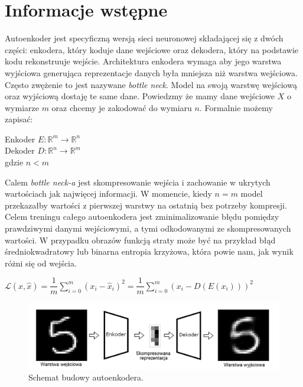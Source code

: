 \documentclass[a4paper,12pt]{book} %
\begin{document}
\section{Informacje wstępne}
Autoenkoder jest specyficzną wersją sieci neuronowej składającej się z dwóch części: enkodera, który koduje dane wejściowe oraz dekodera, który na podstawie kodu rekonstruuje wejście.\cite{bank2021autoencoders} Architektura enkodera wymaga aby jego warstwa wyjściowa generująca reprezentacje danych była mniejsza niż warstwa wejściowa. Często zwężenie to jest nazywane \textit{bottle neck}. Model na swoją warstwę wejściową oraz wyjściową dostaję te same dane. Powiedzmy że mamy dane wejściowe $X$ o wymiarze $m$ oraz chcemy je zakodować do wymiaru $n$. Formalnie możemy zapisać:\\
\begin{center}
	Enkoder $E: \mathbb{R}^m \rightarrow \mathbb{R}^n$\\
	Dekoder $D: \mathbb{R}^n \rightarrow \mathbb{R}^m$ \\
	gdzie $n < m$\\
\end{center}
Calem \textit{bottle neck-a} jest skompresowanie wejścia i zachowanie w ukrytych wartościach jak najwięcej informacji. W momencie, kiedy $n = m$ model przekazałby wartości z pierwszej warstwy na ostatnią bez potrzeby kompresji. Celem treningu całego autoenkodera jest zminimalizowanie błędu pomiędzy prawdziwymi danymi wejściowymi, a tymi odkodowanymi ze skompresowanych wartości. W przypadku obrazów funkcją straty może być na przykład błąd średniokwadratowy lub binarna entropia krzyżowa, która powie nam, jak wynik różni się od wejścia. 
 \begin{center}
 		$\mathcal{L}(x, \hat{x}) = \dfrac{1}{m}\displaystyle\sum_{i=0}^{m}(x_i-\hat{x}_i)^2 = \dfrac{1}{m}\displaystyle\sum_{i=0}^{m}(x_i-D(E(x_i)))^2$
 \end{center}

\begin{figure}[h]
	\centering\includegraphics[width=14.5cm]{pictures/autoencoder.png}
	\caption{Schemat budowy autoenkodera.}
\end{figure}
\newpage
\end{document}
